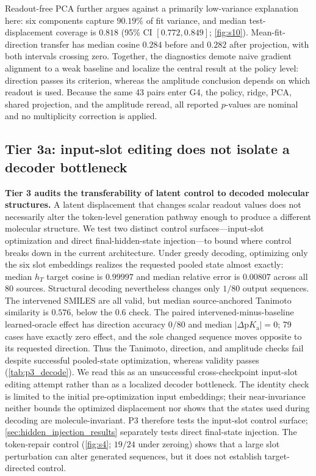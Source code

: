\documentclass[11pt]{article}
\newcommand{\pka}{\mathrm{p}K_{\mathrm a}}
\begin{document}
Readout-free PCA further argues against a primarily low-variance explanation here: six components capture $90.19\%$ of fit variance, and median test-displacement coverage is $0.818$ (95\% CI $[0.772,0.849]$; \cref{fig:s10}). Mean-fit-direction transfer has median cosine $0.284$ before and $0.282$ after projection, with both intervals crossing zero. Together, the diagnostics demote naive gradient alignment to a weak baseline and localize the central result at the policy level: direction passes its criterion, whereas the amplitude conclusion depends on which readout is used. Because the same 43 pairs enter G4, the policy, ridge, PCA, shared projection, and the amplitude reread, all reported $p$-values are nominal and no multiplicity correction is applied.

\subsection{Tier 3a: input-slot editing does not isolate a decoder bottleneck}
\label{sec:p3_results}

\textbf{Tier 3 audits the transferability of latent control to decoded molecular structures.} A latent displacement that changes scalar readout values does not necessarily alter the token-level generation pathway enough to produce a different molecular structure. We test two distinct control surfaces---input-slot optimization and direct final-hidden-state injection---to bound where control breaks down in the current architecture. Under greedy decoding, optimizing only the six slot embeddings realizes the requested pooled state almost exactly: median $h_T$ target cosine is $0.99997$ and median relative error is $0.00807$ across all 80 sources. Structural decoding nevertheless changes only $1/80$ output sequences. The intervened SMILES are all valid, but median source-anchored Tanimoto similarity is $0.576$, below the $0.6$ check. The paired intervened-minus-baseline learned-oracle effect has direction accuracy $0/80$ and median $|\Delta\pka|=0$; 79 cases have exactly zero effect, and the sole changed sequence moves opposite to its requested direction. Thus the Tanimoto, direction, and amplitude checks fail despite successful pooled-state optimization, whereas validity passes (\cref{tab:p3_decode}). We read this as an unsuccessful cross-checkpoint input-slot editing attempt rather than as a localized decoder bottleneck. The identity check is limited to the initial pre-optimization input embeddings; their near-invariance neither bounds the optimized displacement nor shows that the states used during decoding are molecule-invariant. P3 therefore tests the input-slot control surface; \cref{sec:hidden_injection_results} separately tests direct final-state injection. The token-repair control (\cref{fig:s4}; $19/24$ under zeroing) shows that a large slot perturbation can alter generated sequences, but it does not establish target-directed control.
\end{document}
